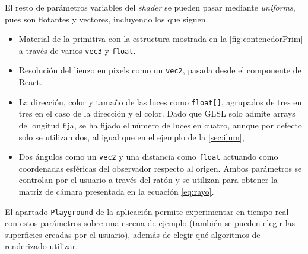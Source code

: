 El resto de parámetros variables del \textit{shader} se pueden pasar mediante \textit{uniforms}, pues son flotantes y vectores, incluyendo los que siguen.
\begin{itemize}
    \item Material de la primitiva con la estructura mostrada en la \autoref{fig:contenedorPrim} a través de varios \texttt{vec3} y \texttt{float}. 
    \item Resolución del lienzo en pixels como un \texttt{vec2}, pasada desde el componente de React.
    \item La dirección, color y tamaño de las luces como \texttt{float[]}, agrupados de tres en tres en el caso de la dirección y el color. Dado que GLSL solo admite arrays de longitud fija, se ha fijado el número de luces en cuatro, aunque por defecto solo se utilizan dos, al igual que en el ejemplo de la \autoref{sec:ilum},
    \item Dos ángulos como un \texttt{vec2} y una distancia como \texttt{float} actuando como coordenadas esféricas del observador respecto al origen. Ambos parámetros se controlan por el usuario a través del ratón y se utilizan para obtener la matriz de cámara presentada en la ecuación \eqref{eq:rayo}.
\end{itemize}
El apartado \texttt{Playground} de la aplicación permite experimentar en tiempo real con estos parámetros sobre una escena de ejemplo (también se pueden elegir las superficies creadas por el usuario), además de elegir qué algoritmos de renderizado utilizar.\newline

